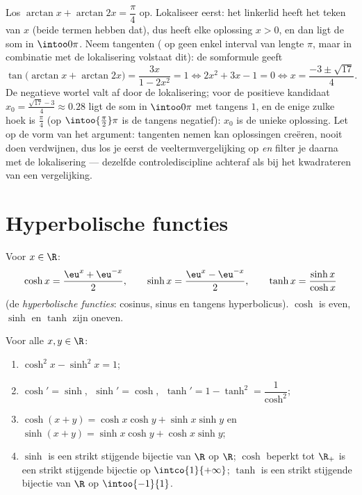 \begin{example}\label{ex:b1:functions:arctaneq}
Los $\arctan x + \arctan 2x = \dfrac\pi4$ op. Lokaliseer eerst: het
linkerlid heeft het teken van $x$ (beide termen hebben dat), dus heeft
elke oplossing $x > 0$, en dan ligt de som in $\intoo0\pi$. Neem
tangenten ( op geen enkel interval van lengte $\pi$, maar in
combinatie met de lokalisering volstaat dit): de somformule geeft
\[
\tan\bigl(\arctan x + \arctan 2x\bigr)
= \frac{3x}{1 - 2x^2} = 1
\iff 2x^2 + 3x - 1 = 0
\iff x = \frac{-3 \pm \sqrt{17}}4 .
\]
De negatieve wortel valt af door de lokalisering; voor de positieve
kandidaat $x_0 = \frac{\sqrt{17} - 3}4 \approx 0.28$ ligt de som in
$\intoo0\pi$ met tangens $1$, en de enige zulke hoek is $\frac\pi4$ (op
$\intoo{\frac\pi2}\pi$ is de tangens negatief): $x_0$ is de unieke
oplossing. Let op de vorm van het argument: tangenten nemen kan
oplossingen creëren, nooit doen verdwijnen, dus los je eerst de
veeltermvergelijking op \emph{en} filter je daarna met de lokalisering
--- dezelfde controlediscipline achteraf als bij het kwadrateren van
een vergelijking.
\end{example}

\section{Hyperbolische functies}

\begin{definition}[$\cosh$, $\sinh$, $\tanh$]\label{def:b1:functions:hyperbolic}
Voor $x \in \R$:
\[
\cosh x = \frac{\eu^x + \eu^{-x}}{2},
\qquad
\sinh x = \frac{\eu^x - \eu^{-x}}{2},
\qquad
\tanh x = \frac{\sinh x}{\cosh x}
\]
(de \emph{hyperbolische functies}: cosinus,
sinus en tangens hyperbolicus). $\cosh$ is even, $\sinh$ en $\tanh$ zijn
oneven.
\end{definition}

\begin{proposition}[Basiseigenschappen]\label{prop:b1:functions:hyprules}
Voor alle $x, y \in \R$:
\begin{enumerate}
  \item $\cosh^2 x - \sinh^2 x = 1$;
  \item $\cosh' = \sinh$, $\;\sinh' = \cosh$, $\;\tanh' = 1 - \tanh^2
        = \dfrac{1}{\cosh^2}$;
  \item $\cosh(x+y) = \cosh x\cosh y + \sinh x \sinh y$ en
        $\sinh(x+y) = \sinh x \cosh y + \cosh x \sinh y$;
  \item $\sinh$ is een strikt stijgende bijectie van $\R$ op $\R$;
        $\cosh$ beperkt tot $\R_+$ is een strikt stijgende bijectie op
        $\intco{1}{+\infty}$; $\tanh$ is een strikt stijgende bijectie
        van $\R$ op $\intoo{-1}{1}$.
\end{enumerate}
\end{proposition}


